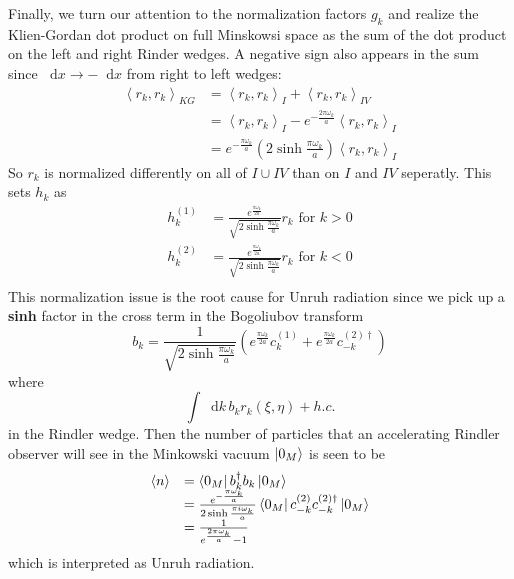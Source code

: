 \documentclass[12pt,a4paper]{article}
\newcommand*\diff{\mathop{}\!\mathrm{d}}
\begin{document}
Finally, we turn our attention to the normalization factors $g_k$ and realize the Klien-Gordan dot product on full Minskowsi space as the sum of the dot product on the left and right Rinder wedges.  A negative sign also appears in the sum since $\diff x \rightarrow -\diff x$ from right to left wedges:
\begin{equation}
 \begin{array}{ll}
  \left< r_k, r_k \right>_{KG} &= \left< r_k, r_k \right>_{I} + \left< r_k, r_k \right>_{IV} \\
  &= \left< r_k, r_k \right>_{I} - e^{- \frac{2\pi \omega_k}{a}} \left< r_k, r_k \right>_{I} \\
  &= e^{-\frac{\pi \omega_k}{a}} (2 \sinh \frac{\pi \omega_k}{a}) \left< r_k, r_k \right>_{I}
  \end{array}
\end{equation}
So $r_k$ is normalized differently on all of $I \cup IV$ than on $I$ and $IV$ seperatly.  This sets $h_k$ as
\begin{equation}
  \begin{array}{ll}
    h_k^{(1)} &= \frac{e^\frac{\pi \omega_k}{2a}}{\sqrt{2 \sinh \frac{\pi \omega_k}{a}}} r_k \text{ for } k>0\\
    h_k^{(2)} &= \frac{e^\frac{\pi \omega_k}{2a}}{\sqrt{2 \sinh \frac{\pi \omega_k}{a}}} r_k \text{ for } k<0\\
  \end{array}
\end{equation}  
This normalization issue is the root cause for Unruh radiation since we pick up a {\bf sinh} factor in the cross term in the Bogoliubov transform
\begin{equation}
  b_k = \frac{1}{\sqrt{2 \sinh \frac{\pi \omega_k}{a}}} \left( e^\frac{\pi \omega_k}{2a} c_k^{(1)} + e^\frac{\pi \omega_k}{2a} c_{-k}^{(2)\dagger} \right)
\label{bogo}
\end{equation}
where
\begin{equation}
  \int \diff k \, b_k r_k(\xi,\eta) + h.c.
\end{equation}
in the Rindler wedge. Then the number of particles that an accelerating Rindler observer will see in the Minkowski vacuum $\ket{0_M}$ is seen to be 
\begin{equation}
  \label{radeq}
  \begin{array}{ll}
    \braket{n} &= \bra{0_M} b_k^\dagger b_k \ket{0_M} \\
               &= \frac{e^{-\frac{\pi \omega_k}{a}}}{2 \sinh \frac{\pi i \omega_k}{a}}\bra{0_M}  c_{-k}^{(2)} c_{-k}^{(2)\dagger} \ket{0_M} \\
               &= \frac{1}{e^{\frac{2 \pi \omega_k}{a}}-1} \\
  \end{array}
\end{equation}
which is interpreted as Unruh radiation.
\end{document}
